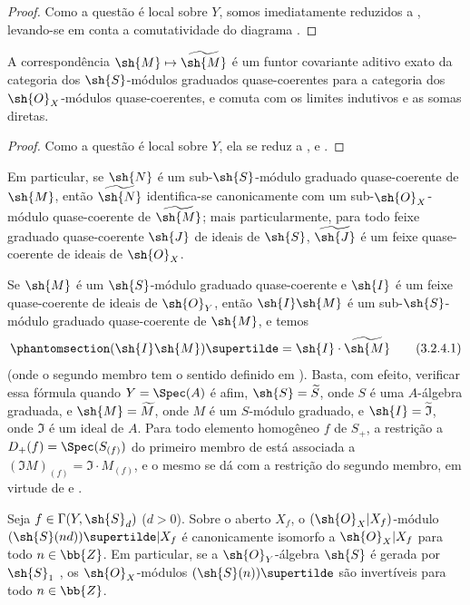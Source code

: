 \documentclass[oneside,10pt]{amsart}
\makeatletter
\newcommand{\ega@arrow}[2]{\mathchoice{#1}{#2}{#2}{#2}}
\let\ega@shortmapsto\mapsto
\renewcommand{\mapsto}{\ega@arrow{\longmapsto}{\ega@shortmapsto}}
\newcommand{\oldpage}[2][]{\marginnote{\normalfont\footnotesize\textbf{#1}~|~#2}\ignorespaces}
\let\EGAOriginalLabel\label
\renewcommand{\label}[1]{\phantomsection\EGAOriginalLabel{#1}}
\makeatother
\begin{document}
\begin{proof}
Como a questão é local sobre $Y$, somos imediatamente reduzidos a , levando-se em conta a comutatividade do diagrama .
\end{proof}

\begin{proposition}[3.2.4]
\label{II.3.2.4}
A correspondência $\sh{M}\mapsto\widetilde{\sh{M}}$ é um funtor covariante aditivo exato da categoria dos $\sh{S}$-módulos graduados quase-coerentes para a categoria dos $\sh{O}_X$-módulos quase-coerentes, e comuta com os limites indutivos e as somas diretas.
\end{proposition}

\begin{proof}
Como a questão é local sobre $Y$, ela se reduz a ,  e .
\end{proof}

Em particular, se $\sh{N}$ é um sub-$\sh{S}$-módulo graduado quase-coerente de $\sh{M}$, então $\widetilde{\sh{N}}$ identifica-se canonicamente com um sub-$\sh{O}_X$-módulo quase-coerente de $\widetilde{\sh{M}}$;
mais particularmente, para todo feixe graduado quase-coerente $\sh{J}$ de ideais de $\sh{S}$, $\widetilde{\sh{J}}$ é um feixe quase-coerente de ideais de $\sh{O}_X$.

Se $\sh{M}$ é um $\sh{S}$-módulo graduado quase-coerente e $\sh{I}$ é um feixe quase-coerente de ideais de $\sh{O}_Y$, então $\sh{I}\sh{M}$ é um sub-$\sh{S}$-módulo graduado quase-coerente de $\sh{M}$, e temos
\[
\label{II.3.2.4.1}
  (\sh{I}\sh{M})\supertilde=\sh{I}\cdot\widetilde{\sh{M}}
\tag{3.2.4.1}
\]
(onde o segundo membro tem o sentido definido em ).
Basta, com efeito, verificar essa fórmula quando $Y=\Spec(A)$ é afim, $\sh{S}=\widetilde{S}$, onde $S$ é uma $A$-álgebra graduada, e $\sh{M}=\widetilde{M}$,
\oldpage[II]{55}
onde $M$ é um $S$-módulo graduado, e $\sh{I}=\widetilde{\mathfrak{I}}$, onde $\mathfrak{I}$ é um ideal de $A$.
Para todo elemento homogêneo $f$ de $S_+$, a restrição a $D_+(f)=\Spec(S_{(f)})$ do primeiro membro de  está associada a $(\mathfrak{I}M)_{(f)}=\mathfrak{I}\cdot M_{(f)}$, e o mesmo se dá com a restrição do segundo membro, em virtude de  e .

\begin{proposition}[3.2.5]
\label{II.3.2.5}
Seja $f\in\Gamma(Y,\sh{S}_d)$ ($d>0$).
Sobre o aberto $X_f$, o $(\sh{O}_X|X_f)$-módulo $(\sh{S}(nd))\supertilde|X_f$ é canonicamente isomorfo a $\sh{O}_X|X_f$ para todo $n\in\bb{Z}$.
Em particular, se a $\sh{O}_Y$-álgebra $\sh{S}$ é gerada por $\sh{S}_1$ , os $\sh{O}_X$-módulos $(\sh{S}(n))\supertilde$ são invertíveis para todo $n\in\bb{Z}$.
\end{proposition}
\end{document}
